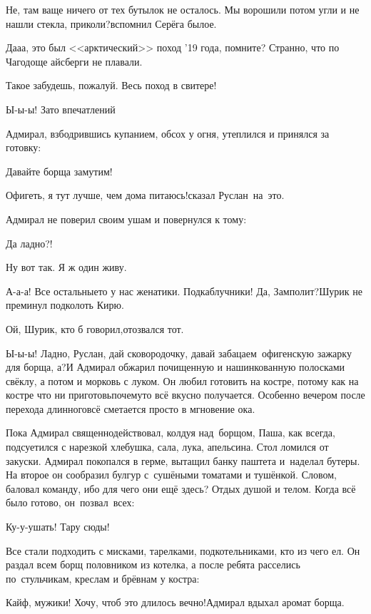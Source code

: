 \diagdash Не, там ваще ничего от тех бутылок не осталось. Мы ворошили потом угли и не нашли стекла, приколи?\mdash вспомнил Серёга былое.

\diagdash Да\sdash а\sdash а, это был <<арктический>> поход '19 года, помните? Странно, что по Чагодоще айсберги не плавали.

\diagdash Такое забудешь, пожалуй. Весь поход в свитере!

\diagdash Ы-ы-ы! Зато впечатлений\myldots{}

Адмирал, взбодрившись купанием, обсох у огня, утеплился и принялся за готовку:

\diagdash Давайте борща замутим!

\diagdash Офигеть, я тут лучше, чем дома питаюсь!\mdash сказал Руслан~на~это.

Адмирал не поверил своим ушам и повернулся к тому:

\diagdash Да ладно?!

\diagdash Ну вот так. Я ж один живу.

\diagdash А-а-а! Все остальные\sdash то у нас женатики. Подкаблучники! Да, Замполит?\mdash Шурик не преминул подколоть Кирю.

\diagdash Ой, Шурик, кто б говорил,\mdash отозвался тот.

\diagdash Ы-ы-ы! Ладно, Руслан, дай сковородочку, давай забацаем~офигенскую зажарку для борща, а?\mdash И Адмирал обжарил почищенную и нашинкованную полосками свёклу, а потом и морковь с луком. Он любил готовить на костре, потому как на костре что ни приготовь\mdash почему\sdash то всё вкусно получается. Особенно вечером после перехода длинного\mdash всё сметается просто в мгновение ока.

Пока Адмирал священнодействовал, колдуя над~борщом, Паша, как всегда, подсуетился с нарезкой хлебушка, сала, лука, апельсина. Стол ломился от закуски. Адмирал покопался в герме, вытащил банку паштета и~наделал бутеры. На второе он сообразил булгур с~сушёными томатами и тушёнкой. Словом, баловал команду, ибо для чего они ещё здесь? Отдых душой и телом. Когда всё было готово, он~позвал~всех:

\diagdash Ку-у-ушать! Тару сюды!

Все стали подходить с мисками, тарелками, подкотельниками, кто из чего ел. Он раздал всем борщ половником из котелка, а после ребята расселись по~стульчикам, креслам и брёвнам у костра:

\diagdash Кайф, мужики! Хочу, чтоб это длилось вечно!\mdash Адмирал вдыхал аромат борща.

